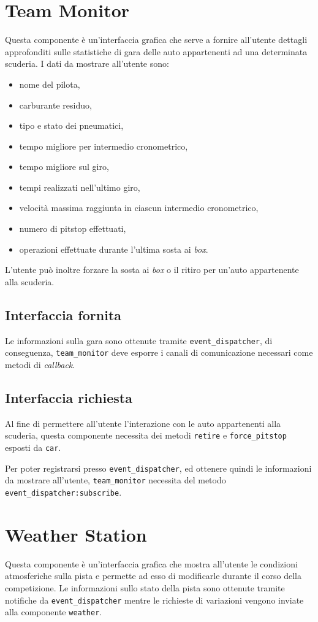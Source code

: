 \documentclass[a4paper]{report}
\newcommand{\fun}[1]{\texttt{#1}}
\begin{document}
\section{Team Monitor}
Questa componente è un'interfaccia grafica che serve a fornire all'utente dettagli approfonditi sulle statistiche di gara delle auto appartenenti ad una determinata scuderia.
I dati da mostrare all'utente sono:
\begin{itemize}
\item nome del pilota,
\item carburante residuo,
\item tipo e stato dei pneumatici,
\item tempo migliore per intermedio cronometrico,
\item tempo migliore sul giro,
\item tempi realizzati nell'ultimo giro,
\item velocità massima raggiunta in ciascun intermedio cronometrico,
\item numero di pitstop effettuati,
\item operazioni effettuate durante l'ultima sosta ai \textit{box}.
\end{itemize}
L'utente può inoltre forzare la sosta ai \textit{box} o il ritiro per un'auto appartenente alla scuderia.

\subsection*{Interfaccia fornita}
Le informazioni sulla gara sono ottenute tramite \texttt{event\_dispatcher}, di conseguenza, \texttt{team\_monitor} deve esporre i canali di comunicazione necessari come metodi di \textit{callback}.
\subsection*{Interfaccia richiesta}
Al fine di permettere all'utente l'interazione con le auto appartenenti alla scuderia, questa componente necessita dei metodi \fun{retire} e \fun{force\_pitstop} esposti da \texttt{car}.

Per poter registrarsi presso \texttt{event\_dispatcher}, ed ottenere quindi le informazioni da mostrare all'utente, \texttt{team\_monitor} necessita del metodo \\\fun{event\_dispatcher:subscribe}.

\section{Weather Station}
Questa componente è un'interfaccia grafica che mostra all'utente le condizioni atmosferiche sulla pista e permette ad esso di modificarle durante il corso della competizione. Le informazioni sullo stato della pista sono ottenute tramite notifiche da \texttt{event\_dispatcher} mentre le richieste di variazioni vengono inviate alla componente \texttt{weather}.
\end{document}
